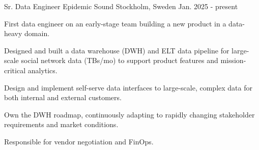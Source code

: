 

\begin{cventries}


  \cventry
    {Sr. Data Engineer} %
    {Epidemic Sound} %
    {Stockholm, Sweden} %
    {Jan. 2025 - present} %
    {
    First data engineer on an early-stage team building a new product in a data-heavy domain.
    \vspace{5.0mm}
      \begin{cvitems} %
        \item {Designed and built a data warehouse (DWH) and ELT data pipeline for large-scale social network data (TBs/mo) to support product features and mission-critical analytics.}
        \item {Design and implement self-serve data interfaces to large-scale, complex data for both internal and external customers.}
        \item {Own the DWH roadmap, continuously adapting to rapidly changing stakeholder requirements and market conditions.}
        \item {Responsible for vendor negotiation and FinOps.}
      \end{cvitems}
    }


\end{cventries}
